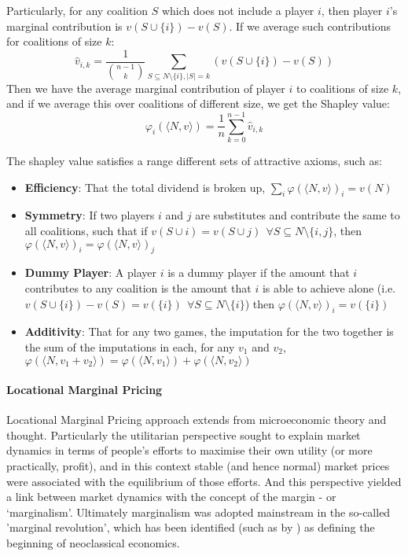 \documentclass[
10pt, %
a4paper, %
oneside, %
headinclude,footinclude, %
BCOR5mm, %
]{scrartcl}
\begin{document}
Particularly, for any coalition $S$ which does not include a player $i$, then player $i$'s marginal contribution is $v(S\cup\{i\}) - v(S)$. If we average such contributions for coalitions of size $k$:
\begin{equation}\label{eq:shapley_value2}
\hat{v}_{i,k} = \frac{1}{\binom{n-1}{k}}\sum_{S\subseteq N\setminus \{ i\} , |S|=k} %
(v(S\cup\{i\})-v(S))
\end{equation}
Then we have the average marginal contribution of player $i$ to coalitions of size $k$, and if we average this over coalitions of different size, we get the Shapley value:
\begin{equation}\label{shap2} \varphi_i(\langle N,v\rangle) = \frac{1}{n}\sum_{k=0}^{n-1}\hat{v}_{i,k} \end{equation}

The shapley value satisfies a range different sets of attractive axioms, such as:
\begin{itemize}
\item	\textbf{Efficiency}: That the total dividend is broken up, $\sum_i\varphi(\langle N,v\rangle)_i = v(N)$
\item	\textbf{Symmetry}: If two players $i$ and $j$ are substitutes and contribute the same to all coalitions, such that if $v(S\cup i)=v(S\cup j)~~\forall S\subseteq N\setminus\{i,j\}$, then $\varphi(\langle N,v\rangle)_i = \varphi(\langle N,v\rangle)_j$
\item	\textbf{Dummy Player}: A player $i$ is a dummy player if the amount that $i$ contributes to any coalition is the amount that $i$ is able to achieve alone (i.e.\ $v(S\cup \{i\})-v(S)=v(\{i\})~~\forall S\subseteq N\setminus\{i\}$) then $\varphi(\langle N,v\rangle)_i=v(\{i\})$
\item	\textbf{Additivity}: That for any two games, the imputation for the two together is the sum of the imputations in each, for any $v_1$ and $v_2$, $\varphi(\langle N,v_1+v_2\rangle)=\varphi(\langle N,v_1 \rangle) + \varphi(\langle N,v_2\rangle)$
\end{itemize}

\paragraph{Locational Marginal Pricing}

Locational Marginal Pricing approach extends from microeconomic theory and thought.
Particularly the utilitarian perspective sought to explain market dynamics in terms of people's efforts to maximise their own utility (or more practically, profit), and in this context stable (and hence normal) market prices were associated with the equilibrium of those efforts.
And this perspective yielded a link between market dynamics with the concept of the margin - or `marginalism'.
Ultimately marginalism was adopted mainstream in the so-called 'marginal revolution', which has been identified (such as by \cite{marginalism1}) as defining the beginning of neoclassical economics.
\end{document}
